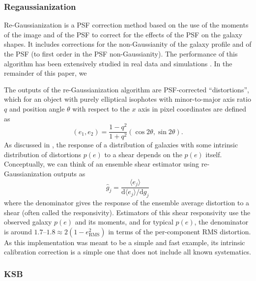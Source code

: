 \documentclass[iop]{emulateapj}
\begin{document}
\subsubsection{Regaussianization}

Re-Gaussianization \citep{2003MNRAS.343..459H} is a PSF correction
method based on the use of the moments of the image and of the PSF to
correct for the effects of the PSF on the galaxy shapes. It includes
corrections for the non-Gaussianity of the galaxy profile
\citep{2002AJ....123..583B,2003MNRAS.343..459H} and of the PSF (to
first order in the PSF non-Gaussianity). The performance of this
algorithm has been extensively studied in real data and simulations
\citep[e.g.,][]{2005MNRAS.361.1287M,2012MNRAS.420.1518M,2013MNRAS.432.1544M,2015MNRAS.450.2963M}. In
the remainder of this paper, we 

The outputs of the re-Gaussianization algorithm are PSF-corrected
``distortions'', which for an object with purely elliptical isophotes
with minor-to-major axis ratio $q$ and position angle $\theta$ with
respect to the $x$ axis in pixel coordinates are defined as
\begin{equation}
(e_1, e_2) = \frac{1-q^2}{1+q^2}\left(\cos{2\theta},\sin{2\theta}\right).
\end{equation}
As discussed in \cite{2002AJ....123..583B}, the response of a
distribution of galaxies with some intrinsic distribution of
distortions $p(e)$ to a shear %
depends on
the $p(e)$ itself.  Conceptually, we can think of an ensemble shear
estimator using re-Gaussianization outputs as
\begin{equation}
\hat{g}_j = \frac{\langle e_j\rangle}{\mathrm{d}\langle e_j\rangle/\mathrm{d}g_j}
\end{equation}
where the denominator gives the response of the ensemble average
distortion to a shear (often called the responsivity).  Estimators of
this shear responsivity use the observed galaxy $p(e)$ and its
moments, and for typical $p(e)$, the denominator is around
$1.7$--$1.8\approx 2 (1-e_\text{RMS}^2)$ in terms of the per-component
RMS distortion. As this implementation was meant to be a simple and
fast example, its intrinsic calibration correction is a simple one
that does not include all known systematics.


\subsubsection{KSB}
\end{document}
